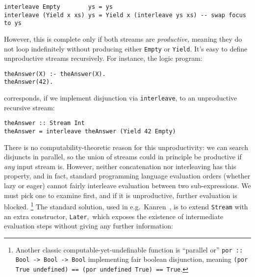 \documentclass[acmsmall,screen,review,anonymous,dvipsnames,svgnames]{acmart}
\newcommand\hask[1]{\texttt{#1}}
\newcommand\ttt\texttt
\begin{document}
\begin{verbatim}
interleave Empty        ys = ys
interleave (Yield x xs) ys = Yield x (interleave ys xs) -- swap focus to ys
\end{verbatim}

\noindent
However, this is complete only if both streams are \emph{productive,} meaning
they do not loop indefinitely without producing either \hask{Empty} or \hask{Yield}.
It's easy to define unproductive streams recursively.
For instance, the logic program:

\begin{verbatim}
theAnswer(X) :- theAnswer(X).
theAnswer(42).
\end{verbatim}

\noindent
corresponds, if we implement disjunction via \ttt{interleave}, to an unproductive recursive stream:

\begin{verbatim}
theAnswer :: Stream Int
theAnswer = interleave theAnswer (Yield 42 Empty)
\end{verbatim}


\noindent
There is no computability-theoretic reason for this unproductivity: we can search disjuncts in parallel, so the union of streams could in principle be productive if \emph{any} input stream is.
However, neither concatenation nor interleaving has this property, and in fact, standard programming language evaluation orders (whether lazy or eager) cannot fairly interleave evaluation between two sub-expressions.
We must pick one to examine first, and if it is unproductive, further evaluation is blocked.%
\footnote{Another classic computable-yet-undefinable function is ``parallel or'' \hask{por :: Bool -> Bool -> Bool} implementing fair boolean disjunction, meaning \hask{(por True undefined) == (por undefined True) == True}.}
%
The standard solution, used in e.g.~\textmu{}Kanren~\citep{muKanren}, is to extend \hask{Stream} with an extra constructor, \hask{Later},\footnotemark\ which exposes the existence of intermediate evaluation steps without giving any further information:
\end{document}
